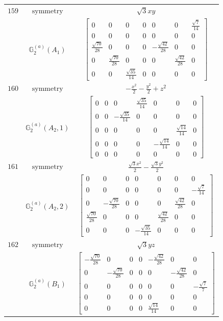 \documentclass[fleqn,8pt,landscape]{jsarticle}
\begin{document}
\begin{longtable}{ccc}
$ 159 $ & $ \text{symmetry} $ & $ \sqrt{3} x y $ \\
$  $ & $ \mathbb{G}_{2}^{(a)}(A_{1}) $ & $ \begin{bmatrix} 0 & 0 & 0 & 0 & 0 & 0 & \frac{\sqrt{7}}{14} \\ 0 & 0 & 0 & 0 & 0 & 0 & 0 \\ \frac{\sqrt{70}}{28} & 0 & 0 & 0 & - \frac{\sqrt{42}}{28} & 0 & 0 \\ 0 & \frac{\sqrt{70}}{28} & 0 & 0 & 0 & \frac{\sqrt{42}}{28} & 0 \\ 0 & 0 & \frac{\sqrt{35}}{14} & 0 & 0 & 0 & 0 \end{bmatrix} $ \\ \hline
$ 160 $ & $ \text{symmetry} $ & $ - \frac{x^{2}}{2} - \frac{y^{2}}{2} + z^{2} $ \\
$  $ & $ \mathbb{G}_{2}^{(a)}(A_{2},1) $ & $ \begin{bmatrix} 0 & 0 & 0 & \frac{\sqrt{35}}{14} & 0 & 0 & 0 \\ 0 & 0 & - \frac{\sqrt{35}}{14} & 0 & 0 & 0 & 0 \\ 0 & 0 & 0 & 0 & 0 & \frac{\sqrt{14}}{14} & 0 \\ 0 & 0 & 0 & 0 & - \frac{\sqrt{14}}{14} & 0 & 0 \\ 0 & 0 & 0 & 0 & 0 & 0 & 0 \end{bmatrix} $ \\ \hline
$ 161 $ & $ \text{symmetry} $ & $ \frac{\sqrt{3} x^{2}}{2} - \frac{\sqrt{3} y^{2}}{2} $ \\
$  $ & $ \mathbb{G}_{2}^{(a)}(A_{2},2) $ & $ \begin{bmatrix} 0 & 0 & 0 & 0 & 0 & 0 & 0 \\ 0 & 0 & 0 & 0 & 0 & 0 & - \frac{\sqrt{7}}{14} \\ 0 & - \frac{\sqrt{70}}{28} & 0 & 0 & 0 & \frac{\sqrt{42}}{28} & 0 \\ \frac{\sqrt{70}}{28} & 0 & 0 & 0 & \frac{\sqrt{42}}{28} & 0 & 0 \\ 0 & 0 & 0 & - \frac{\sqrt{35}}{14} & 0 & 0 & 0 \end{bmatrix} $ \\ \hline
$ 162 $ & $ \text{symmetry} $ & $ \sqrt{3} y z $ \\
$  $ & $ \mathbb{G}_{2}^{(a)}(B_{1}) $ & $ \begin{bmatrix} - \frac{\sqrt{70}}{28} & 0 & 0 & 0 & - \frac{\sqrt{42}}{28} & 0 & 0 \\ 0 & - \frac{\sqrt{70}}{28} & 0 & 0 & 0 & - \frac{\sqrt{42}}{28} & 0 \\ 0 & 0 & 0 & 0 & 0 & 0 & - \frac{\sqrt{7}}{7} \\ 0 & 0 & 0 & 0 & 0 & 0 & 0 \\ 0 & 0 & 0 & 0 & \frac{\sqrt{14}}{14} & 0 & 0 \end{bmatrix} $ \\ \hline

\end{longtable}
\end{document}
